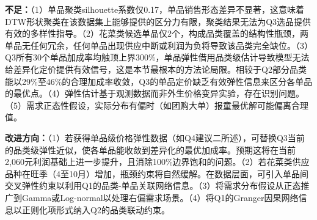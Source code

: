\documentclass[12pt,a4paper]{article}
\begin{document}
\textbf{不足：}（1）单品聚类silhouette系数仅0.17，单品销售形态差异不显著，这意味着DTW形状聚类在该数据集上能够提供的区分力有限，聚类结果无法为Q3选品提供有效的多样性指导。（2）花菜类候选单品仅2个，构成品类覆盖的结构性瓶颈，两单品无任何冗余，任何单品出现供应中断或利润为负将导致该品类完全缺位。（3）Q3所有30个单品加成率均触顶上界300\%，单品弹性借用品类级估计导致模型无法给差异化定价提供有效信号，这是本节最根本的方法论局限。相较于Q2部分品类能以29\%至46\%的合理加成率收敛，Q3的单品定价缺乏有效弹性信息来区分各单品的最优点。（4）弹性估计基于观测数据而非外生价格变异实验，存在识别问题。（5）需求正态性假设，实际分布有偏时（如团购大单）报童最优解可能偏离合理值。

\textbf{改进方向：}（1）若获得单品级价格弹性数据（如Q4建议二所述），可替换Q3当前的品类级弹性近似，使各单品能收敛到差异化的最优加成率。预期这将在当前2,060元利润基础上进一步提升，且消除100\%边界饱和的问题。（2）若花菜类供应品种在旺季（4至10月）增加，瓶颈约束将自然缓解。在数据层面，可引入单品间交叉弹性约束以利用Q1的品类-单品关联网络信息。（3）将需求分布假设从正态推广到Gamma或Log-normal以处理右偏需求场景。（4）将Q1的Granger因果网络信息以正则化项形式纳入Q2的品类联动约束。
\end{document}

